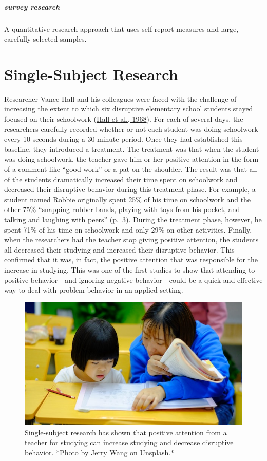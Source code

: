 \documentclass[
]{krantz}
\begin{document}
\hypertarget{survey-research-1}{%
\paragraph*{survey research}\label{survey-research-1}}

A quantitative research approach that uses self-report measures and large, carefully selected samples.

\hypertarget{single-subject-research}{%
\chapter{Single-Subject Research}\label{single-subject-research}}

Researcher Vance Hall and his colleagues were faced with the challenge of increasing the extent to which six disruptive elementary school students stayed focused on their schoolwork (\protect\hyperlink{ref-hall1968effects}{Hall et al., 1968}). For each of several days, the researchers carefully recorded whether or not each student was doing schoolwork every 10 seconds during a 30-minute period. Once they had established this baseline, they introduced a treatment. The treatment was that when the student was doing schoolwork, the teacher gave him or her positive attention in the form of a comment like ``good work'' or a pat on the shoulder. The result was that all of the students dramatically increased their time spent on schoolwork and decreased their disruptive behavior during this treatment phase. For example, a student named Robbie originally spent 25\% of his time on schoolwork and the other 75\% ``snapping rubber bands, playing with toys from his pocket, and talking and laughing with peers'' (p.~3). During the treatment phase, however, he spent 71\% of his time on schoolwork and only 29\% on other activities. Finally, when the researchers had the teacher stop giving positive attention, the students all decreased their studying and increased their disruptive behavior. This confirmed that it was, in fact, the positive attention that was responsible for the increase in studying. This was one of the first studies to show that attending to positive behavior---and ignoring negative behavior---could be a quick and effective way to deal with problem behavior in an applied setting.

\begin{figure}

{\centering \includegraphics[width=0.5\linewidth]{images/single-N/teacher} 

}

\caption{Single-subject research has shown that positive attention from a teacher for studying can increase studying and decrease disruptive behavior. *Photo by Jerry Wang on Unsplash.*}\label{fig:teacher}
\end{figure}
\end{document}

